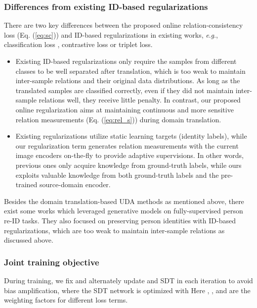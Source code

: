 \documentclass[journal]{IEEEtran}
\newcommand{\eg}{\textit{e}.\textit{g}., }
\begin{document}
\subsubsection{\textbf{Differences from existing ID-based regularizations}}
There are two key differences between the proposed online relation-consistency loss (Eq. (\ref{eq:sc})) and ID-based regularizations in existing works, \eg classification loss \cite{deng2018similarity,chen2019instance,zou2020joint}, contrastive loss \cite{deng2018image} or triplet loss.
\begin{itemize}
\item Existing ID-based regularizations only require the samples from different classes to be well separated after translation, which is too weak to maintain inter-sample relations and their original data distributions. As long as the translated samples are classified correctly, even if they did not maintain inter-sample relations well, they receive little penalty. In contrast, our proposed online regularization aims at maintaining continuous and more sensitive relation measurements (Eq. (\ref{eq:rel_s})) during domain translation.
\item Existing regularizations utilize static learning targets (identity labels), while our regularization term generates relation measurements with the current image encoders on-the-fly to provide adaptive supervisions.
In other words, previous ones only acquire knowledge from ground-truth labels, while ours exploits valuable knowledge from both ground-truth labels and the pre-trained source-domain encoder.
\end{itemize}

Besides the domain translation-based UDA methods as mentioned above, there exist some works \cite{liu2018pose,ge2018fd,zheng2019joint} which leveraged generative models on fully-supervised person re-ID tasks. They also focused on preserving person identities with ID-based regularizations, which are too weak to maintain inter-sample relations as discussed above.


\subsubsection{\textbf{Joint training objective}}

During training, we fix  and alternately update  and SDT in each iteration to avoid bias amplification,
where the SDT network is optimized with
{
}Here , ,  and  are the weighting factors for different loss terms.
\end{document}
